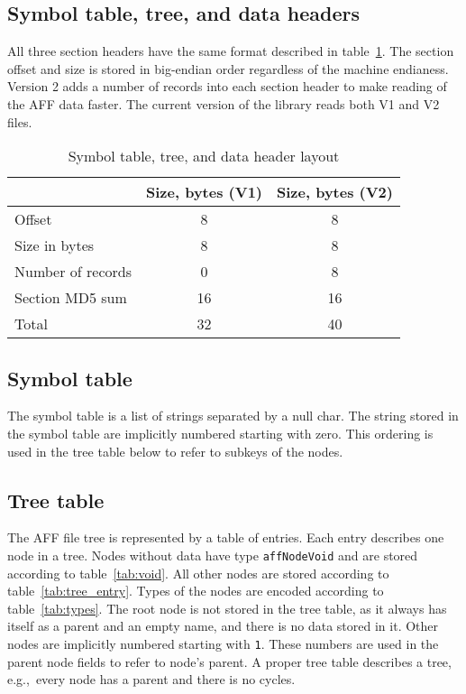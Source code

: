 \documentclass[10pt,letterpaper]{article}
\newcommand{\bc}{\begin{center}}
\newcommand{\ec}{\end{center}}
\newcommand{\ctext}[1]{\texttt{#1}}         %
\begin{document}
\subsection{Symbol table, tree, and data headers}
All three section headers have the same format described in
table~\ref{tab:shdr}. The section offset and size is stored in
big-endian order regardless of the machine endianess.  Version 2 adds
a number of records into each section header to make reading of the
AFF data faster. The current version of the library reads both V1 and
V2 files.
\begin{table}[h]
\bc
\caption{Symbol table, tree, and data header layout}\label{tab:shdr}
\begin{tabular}{|l|c|c|} \hline
 & Size, bytes (V1) & Size, bytes (V2) \\ \hline\hline
Offset  & 8 & 8\\ \hline
Size in bytes & 8 & 8\\ \hline
Number of records & 0 & 8\\ \hline
Section MD5 sum & 16 & 16 \\ \hline\hline
Total & 32 & 40 \\ \hline
\end{tabular}
\ec
\end{table}

\subsection{Symbol table}
The symbol table is a list of strings separated by a null char. The
string stored in the symbol table are implicitly numbered starting
with zero. This ordering is used in the tree table below to refer to
subkeys of the nodes.

\subsection{Tree table}
The AFF file tree is represented by a table of entries. Each entry
describes one node in a tree. Nodes without data have type
\ctext{affNodeVoid} and are stored according to
table~\ref{tab:void}. All other nodes are stored according to
table~\ref{tab:tree_entry}. Types of the nodes are encoded according to
table~\ref{tab:types}. The root node is not stored in the tree table,
as it always has itself as a parent and an empty name, and there is no
data stored in it. Other nodes are implicitly numbered starting with
\ctext{1}. These numbers are used in the parent node fields to refer
to node's parent. A proper tree table describes a tree, e.g.,~every
node has a parent and there is no cycles.
\end{document}
